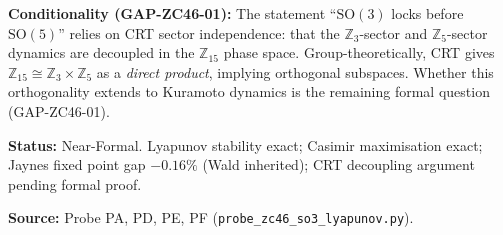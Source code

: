 \documentclass[12pt, a4paper]{article}
\begin{document}
\begin{derivedbox}[title={FIND-ZC46-01: SO(3)$\times$SO(5) Is
  the Unique Stable Attractor of $\Phi$-field Dynamics on $n=8$
  Modes (Near-Formal)}]
\textbf{Conditionality (GAP-ZC46-01):}
The statement ``$\mathrm{SO}(3)$ locks before $\mathrm{SO}(5)$''
relies on CRT sector independence: that the $\mathbb{Z}_3$-sector
and $\mathbb{Z}_5$-sector dynamics are decoupled in the
$\mathbb{Z}_{15}$ phase space.
Group-theoretically, CRT gives $\mathbb{Z}_{15} \cong
\mathbb{Z}_3 \times \mathbb{Z}_5$ as a \emph{direct product},
implying orthogonal subspaces.
Whether this orthogonality extends to Kuramoto dynamics is the
remaining formal question (GAP-ZC46-01).

\textbf{Status:} Near-Formal.
Lyapunov stability exact; Casimir maximisation exact;
Jaynes fixed point gap $-0.16\%$ (Wald inherited);
CRT decoupling argument pending formal proof.

\textbf{Source:} Probe PA, PD, PE, PF
(\texttt{probe\_zc46\_so3\_lyapunov.py}).
\end{derivedbox}



\end{document}
